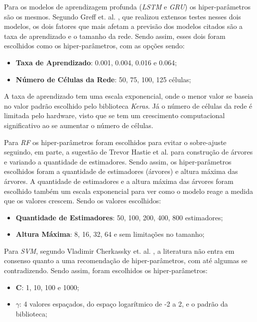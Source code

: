 Para os modelos de aprendizagem profunda (\textit{\acrshort{LSTM}} e \textit{\acrshort{GRU}}) os hiper-parâmetros são os mesmos. Segundo Greff et. al. \cite{Greff_2015}, que realizou extensos testes nesses dois modelos, os dois fatores que mais afetam a previsão dos modelos citados são a taxa de aprendizado e o tamanho da rede. Sendo assim, esses dois foram escolhidos como os hiper-parâmetros, com as opções sendo:

\begin{itemize}
    \item \textbf{Taxa de Aprendizado}: 0.001, 0.004, 0.016 e 0.064;
    \item \textbf{Número de Células da Rede}: 50, 75, 100, 125 células;
\end{itemize}

A taxa de aprendizado tem uma escala exponencial, onde o menor valor se baseia no valor padrão escolhido pelo biblioteca \textit{Keras}. Já o número de células da rede é limitada pelo hardware, visto que se tem um crescimento computacional significativo ao se aumentar o número de células. 

Para \textit{\acrshort{RF}} os hiper-parâmetros foram escolhidos para evitar o sobre-ajuste seguindo, em parte, a sugestão de Trevor Hastie et al. \cite{hastie2005elements} para construção de árvores e variando a quantidade de estimadores. Sendo assim, os hiper-parâmetros escolhidos foram a quantidade de estimadores (árvores) e altura máxima das árvores. A quantidade de estimadores e a altura máxima das árvores foram escolhido também um escala exponencial para ver como o modelo reage a medida que os valores crescem.  Sendo os valores escolhidos:

\begin{itemize}
    \item \textbf{Quantidade de Estimadores}: 50, 100, 200, 400, 800 estimadores;
    \item \textbf{Altura Máxima}: 8, 16, 32, 64 e sem limitações no tamanho;
\end{itemize}

Para \textit{\acrshort{SVM}}, segundo Vladimir Cherkassky et. al. \cite{CHERKASSKY2004113}, a literatura não entra em consenso quanto a uma recomendação de hiper-parâmetros, com até algumas se contradizendo. Sendo assim, foram escolhidos os hiper-parâmetros:

\begin{itemize}
    \item \textbf{C}: 1, 10, 100 e 1000;
    \item \textbf{\(\gamma\)}: 4 valores espaçados, do espaço logarítmico de -2 a 2, e o padrão da biblioteca; 
\end{itemize}

